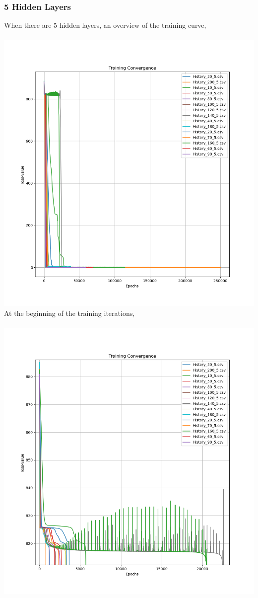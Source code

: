 \documentclass[a4paper, 12pt]{report}
\def\size{0.75}
\begin{document}
\begin{center}
\subsubsection{5 Hidden Layers}
When there are $5$ hidden layers, an overview of the training curve,
\\~\\\includegraphics[scale=\size]{Depth_5_Overview.png}
\newpage
At the beginning of the training iterations,
\\~\\\includegraphics[scale=\size]{Depth_5_Beginning.png}

\end{center}
\end{document}
